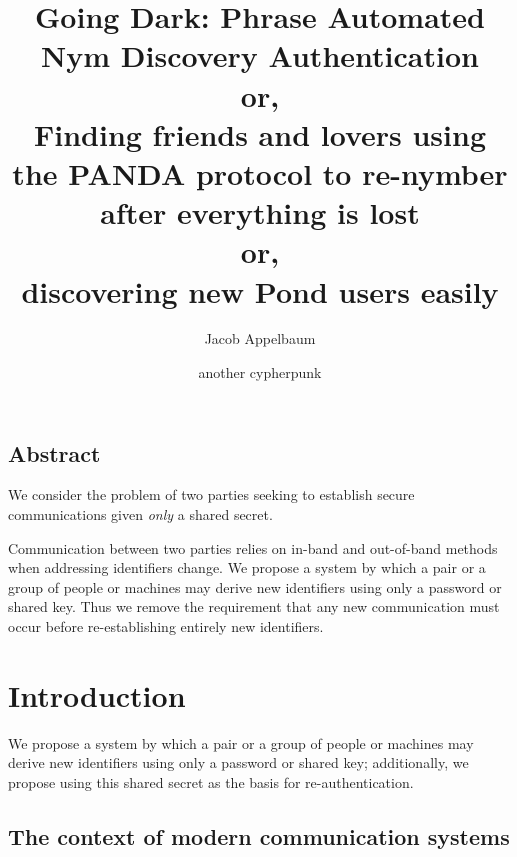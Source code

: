 \documentclass[letterpaper,twocolumn,10pt]{article}
\begin{document}
\date{}

\title{
\Large \bf Going Dark: Phrase Automated Nym Discovery Authentication\\
\small or,\\
Finding friends and lovers using the PANDA protocol to re-nymber after everything is lost\\
\small or, \\
discovering new Pond users easily
}

\author{
{\rm Jacob Appelbaum}\\
\and
{\rm another cypherpunk}\\
}

\maketitle

\thispagestyle{empty}

\subsection*{Abstract}

We consider the problem of two parties seeking to establish secure
communications given {\it only} a shared secret.

Communication between two parties relies on in-band and out-of-band methods
when addressing identifiers change. We propose a system by which a pair or a
group of people or machines may derive new identifiers using only a password or
shared key. Thus we remove the requirement that any new communication must
occur before re-establishing entirely new identifiers.

\section{Introduction}

We propose a system by which a pair or a group of people or machines may derive
new identifiers using only a password or shared key; additionally, we propose
using this shared secret as the basis for re-authentication.

\subsection{The context of modern communication systems}
\label{sec:context}
\end{document}
